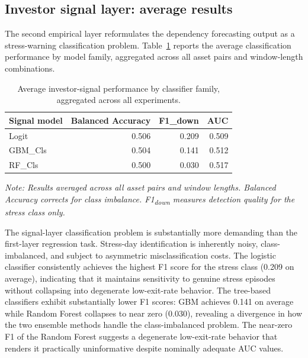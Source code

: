 \subsection{Investor signal layer: average results}

The second empirical layer reformulates the dependency forecasting output as a stress-warning classification problem. Table~\ref{tab:signal_summary} reports the average classification performance by model family, aggregated across all asset pairs and window-length combinations.

\begin{table}[H]
    \centering
    \caption{Average investor-signal performance by classifier family, aggregated across all experiments.}
    \label{tab:signal_summary}
    \begin{tabular}{lrrr}
        \toprule
        Signal model & Balanced Accuracy & F1\_down & AUC \\
        \midrule
        Logit & 0.506 & 0.209 & 0.509 \\
        GBM\_Cls & 0.504 & 0.141 & 0.512 \\
        RF\_Cls & 0.500 & 0.030 & 0.517 \\
        \bottomrule
    \end{tabular}
    \par\smallskip\noindent\footnotesize{\textit{Note: Results averaged across all asset pairs and window lengths. Balanced Accuracy corrects for class imbalance. F1\textsubscript{down} measures detection quality for the stress class only.}}
\end{table}

The signal-layer classification problem is substantially more demanding than the first-layer regression task. Stress-day identification is inherently noisy, class-imbalanced, and subject to asymmetric misclassification costs. The logistic classifier consistently achieves the highest F1 score for the stress class (0.209 on average), indicating that it maintains sensitivity to genuine stress episodes without collapsing into degenerate low-exit-rate behavior. The tree-based classifiers exhibit substantially lower F1 scores: GBM achieves 0.141 on average while Random Forest collapses to near zero (0.030), revealing a divergence in how the two ensemble methods handle the class-imbalanced problem. The near-zero F1 of the Random Forest suggests a degenerate low-exit-rate behavior that renders it practically uninformative despite nominally adequate AUC values.

